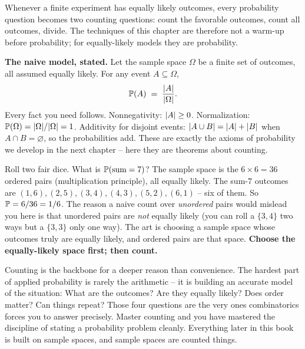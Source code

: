 Whenever a finite experiment has equally
likely outcomes, every probability question becomes two counting questions: count the
favorable outcomes, count all outcomes, divide. The techniques of this chapter are
therefore not a warm-up before probability; for equally-likely models they are
probability.

\begin{formalbox}
\textbf{The naive model, stated.} Let the sample space $\Omega$ be a finite set of outcomes,
all assumed equally likely. For any event $A \subseteq \Omega$,
\[
  \P(A) \;=\; \frac{\abs{A}}{\abs{\Omega}}.
\]
Every fact you need follows. Nonnegativity: $\abs{A} \ge 0$. Normalization:
$\P(\Omega) = \abs{\Omega}/\abs{\Omega} = 1$. Additivity for disjoint events:
$\abs{A \cup B} = \abs{A} + \abs{B}$ when $A \cap B = \varnothing$, so the probabilities
add. These are exactly the axioms of probability we develop in the next chapter -- here
they are theorems about counting.
\end{formalbox}

\begin{example}
\label{ch2:ex-twodice}
Roll two fair dice. What is $\P(\text{sum} = 7)$? The sample space is the $6 \times 6 = 36$
ordered pairs (multiplication principle), all equally likely. The sum-$7$ outcomes are
$(1,6),(2,5),(3,4),(4,3),(5,2),(6,1)$ -- six of them. So $\P = 6/36 = 1/6$. The reason a
naive count over \emph{unordered} pairs would mislead you here is that unordered pairs are
\emph{not} equally likely (you can roll a $\{3,4\}$ two ways but a $\{3,3\}$ only one way).
The art is choosing a sample space whose outcomes truly are equally likely, and ordered
pairs are that space. \textbf{Choose the equally-likely space first; then count.}
\end{example}

\begin{aestheticbox}
Counting is the backbone for a deeper reason than convenience. The hardest part of applied
probability is rarely the arithmetic -- it is building an accurate model of the situation:
What are the outcomes? Are they equally likely? Does order matter? Can things repeat? Those
four questions are the very ones combinatorics forces you to answer precisely. Master
counting and you have mastered the discipline of stating a probability problem cleanly.
Everything later in this book is built on sample spaces, and sample spaces are counted things.
\end{aestheticbox}

